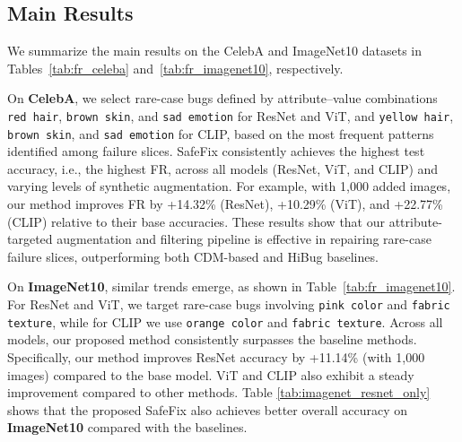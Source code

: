 \documentclass[10pt]{article} %
\newcommand{\model}{SafeFix\xspace}
\newcommand{\hibug}{HiBug\xspace}
\begin{document}
\subsection{Main Results} 
\label{sec:main_results}




We summarize the main results on the CelebA and ImageNet10 datasets in Tables~\ref{tab:fr_celeba} and~\ref{tab:fr_imagenet10}, respectively.



On \textbf{CelebA}, we select rare-case bugs defined by attribute–value combinations \texttt{red hair}, \texttt{brown skin}, and \texttt{sad emotion} for ResNet and ViT, and \texttt{yellow hair}, \texttt{brown skin}, and \texttt{sad emotion} for CLIP, based on the most frequent patterns identified among failure slices. \model{} consistently achieves the highest test accuracy, i.e., the highest FR, across all models (ResNet, ViT, and CLIP) and varying levels of synthetic augmentation. For example, with 1{,}000 added images, our method improves FR by +14.32\% (ResNet), +10.29\% (ViT), and +22.77\% (CLIP) relative to their base accuracies. These results show that our attribute-targeted augmentation and filtering pipeline is effective in repairing rare-case failure slices, outperforming both CDM-based and \hibug{} baselines.


On \textbf{ImageNet10}, similar trends emerge, as shown in Table~\ref{tab:fr_imagenet10}. For ResNet and ViT, we target rare-case bugs involving \texttt{pink color} and \texttt{fabric texture}, while for CLIP we use \texttt{orange color} and \texttt{fabric texture}. Across all models, our proposed method consistently surpasses the baseline methods. Specifically, our method improves ResNet accuracy by +11.14\% (with 1{,}000 images) compared to the base model. ViT and CLIP also exhibit a steady improvement compared to other methods. Table \ref{tab:imagenet_resnet_only} shows that the proposed SafeFix also achieves better overall accuracy on \textbf{ImageNet10} compared with the baselines.
\end{document}
